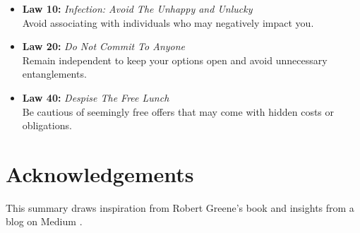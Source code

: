 \documentclass[a4paper,10.8pt]{article}
\begin{document}
\begin{itemize}[leftmargin=*, label={--}]
    \item \textbf{Law 10:} \textit{Infection: Avoid The Unhappy and Unlucky} \\
    Avoid associating with individuals who may negatively impact you.
    
    \item \textbf{Law 20:} \textit{Do Not Commit To Anyone} \\
    Remain independent to keep your options open and avoid unnecessary entanglements.
    
    \item \textbf{Law 40:} \textit{Despise The Free Lunch} \\
    Be cautious of seemingly free offers that may come with hidden costs or obligations.
\end{itemize}

\clearpage

\section*{Acknowledgements}

This summary draws inspiration from Robert Greene's book \citep{greene201048} and insights from a blog on Medium \citep{mediumBlog}.



\end{document}
